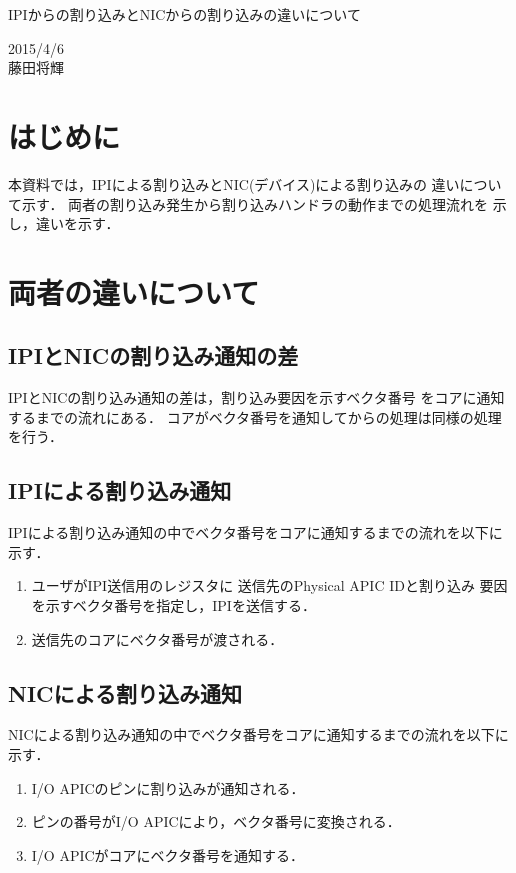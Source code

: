 \documentclass[12pt]{jsarticle}
\begin{document}

\begin{center}
{\LARGE IPIからの割り込みとNICからの割り込みの違いについて}
\end{center}

\begin{flushright}
  2015/4/6\\
  藤田将輝
\end{flushright}
\section{はじめに}
本資料では，IPIによる割り込みとNIC(デバイス)による割り込みの
違いについて示す．
両者の割り込み発生から割り込みハンドラの動作までの処理流れを
示し，違いを示す．
\section{両者の違いについて}
\subsection{IPIとNICの割り込み通知の差}
IPIとNICの割り込み通知の差は，割り込み要因を示すベクタ番号
をコアに通知するまでの流れにある．
コアがベクタ番号を通知してからの処理は同様の処理を行う．
\subsection{IPIによる割り込み通知}
IPIによる割り込み通知の中でベクタ番号をコアに通知するまでの流れを以下に示す．
        \begin{enumerate}
            \item ユーザがIPI送信用のレジスタに
                送信先のPhysical APIC IDと割り込み
                要因を示すベクタ番号を指定し，IPIを送信する．
            \item 送信先のコアにベクタ番号が渡される．
        \end{enumerate}
\subsection{NICによる割り込み通知}
NICによる割り込み通知の中でベクタ番号をコアに通知するまでの流れを以下に示す．
        \begin{enumerate}
            \item I/O APICのピンに割り込みが通知される．
            \item ピンの番号がI/O APICにより，ベクタ番号に変換される．
            \item I/O APICがコアにベクタ番号を通知する．
        \end{enumerate}
\end{document}

